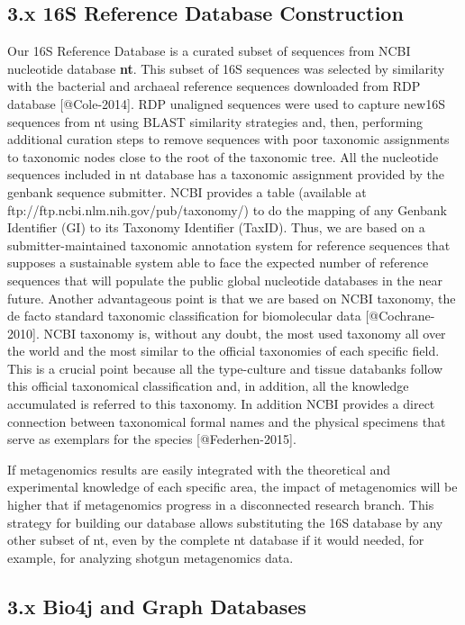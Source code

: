\documentclass{frontiersSCNS} %
\begin{document}
\subsection{3.x 16S Reference Database
Construction}\label{x-16s-reference-database-construction}

Our 16S Reference Database is a curated subset of sequences from NCBI
nucleotide database \textbf{nt}. This subset of 16S sequences was
selected by similarity with the bacterial and archaeal reference
sequences downloaded from RDP database {[}@Cole-2014{]}. RDP unaligned
sequences were used to capture new16S sequences from nt using BLAST
similarity strategies and, then, performing additional curation steps to
remove sequences with poor taxonomic assignments to taxonomic nodes
close to the root of the taxonomic tree. All the nucleotide sequences
included in nt database has a taxonomic assignment provided by the
genbank sequence submitter. NCBI provides a table (available at
ftp://ftp.ncbi.nlm.nih.gov/pub/taxonomy/) to do the mapping of any
Genbank Identifier (GI) to its Taxonomy Identifier (TaxID). Thus, we are
based on a submitter-maintained taxonomic annotation system for
reference sequences that supposes a sustainable system able to face the
expected number of reference sequences that will populate the public
global nucleotide databases in the near future. Another advantageous
point is that we are based on NCBI taxonomy, the de facto standard
taxonomic classification for biomolecular data {[}@Cochrane-2010{]}.
NCBI taxonomy is, without any doubt, the most used taxonomy all over the
world and the most similar to the official taxonomies of each specific
field. This is a crucial point because all the type-culture and tissue
databanks follow this official taxonomical classification and, in
addition, all the knowledge accumulated is referred to this taxonomy. In
addition NCBI provides a direct connection between taxonomical formal
names and the physical specimens that serve as exemplars for the species
{[}@Federhen-2015{]}.

If metagenomics results are easily integrated with the theoretical and
experimental knowledge of each specific area, the impact of metagenomics
will be higher that if metagenomics progress in a disconnected research
branch. This strategy for building our database allows substituting the
16S database by any other subset of nt, even by the complete nt database
if it would needed, for example, for analyzing shotgun metagenomics
data.

\subsection{3.x Bio4j and Graph
Databases}\label{x-bio4j-and-graph-databases}
\end{document}
